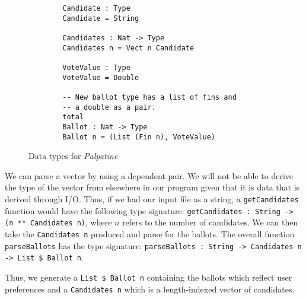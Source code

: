 \begin{figure}[ht!!!!!!]
    \caption{Data types for \textit{Palpatine}}
    \label{stv_data_types}
    \begin{lstlisting}
        Candidate : Type
        Candidate = String

        Candidates : Nat -> Type
        Candidates n = Vect n Candidate
        
        VoteValue : Type
        VoteValue = Double

        -- New ballot type has a list of fins and
        -- a double as a pair. 
        total
        Ballot : Nat -> Type
        Ballot n = (List (Fin n), VoteValue)
    \end{lstlisting}
\end{figure}

We can parse a vector by using a dependent pair. We will not be able to derive
the type of the vector from elsewhere in our program given that it is data that
is derived through I/O. Thus, if we had our input file as a string, a
\texttt{getCandidates} function would have the following type signature:
\texttt{getCandidates : String -> (n ** Candidates n)}, where $n$ refers to the
number of candidates. We can then take the \texttt{Candidates n} produced and
parse for the ballots. The overall function \texttt{parseBallots} has the type
signature: \texttt{parseBallots : String -> Candidates n -> List \$ Ballot n}.

Thus, we generate a \texttt{List \$ Ballot n} containing the ballots which
reflect user preferences and a \texttt{Candidates n} which is a length-indexed
vector of candidates. 